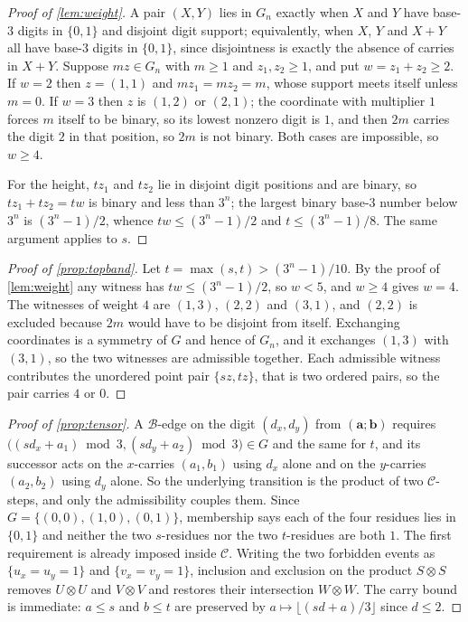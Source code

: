 \documentclass[11pt]{amsart}
\theoremstyle{definition}
\theoremstyle{remark}
\begin{document}
\begin{proof}[Proof of \cref{lem:weight}]
A pair $(X,Y)$ lies in $G_n$ exactly when $X$ and $Y$ have base-$3$ digits in $\{0,1\}$ and disjoint digit support; equivalently, when $X$, $Y$ and $X+Y$ all have base-$3$ digits in $\{0,1\}$, since disjointness is exactly the absence of carries in $X+Y$. Suppose $mz\in G_n$ with $m\ge 1$ and $z_1,z_2\ge 1$, and put $w=z_1+z_2\ge 2$. If $w=2$ then $z=(1,1)$ and $mz_1=mz_2=m$, whose support meets itself unless $m=0$. If $w=3$ then $z$ is $(1,2)$ or $(2,1)$; the coordinate with multiplier $1$ forces $m$ itself to be binary, so its lowest nonzero digit is $1$, and then $2m$ carries the digit $2$ in that position, so $2m$ is not binary. Both cases are impossible, so $w\ge 4$.

For the height, $tz_1$ and $tz_2$ lie in disjoint digit positions and are binary, so $tz_1+tz_2=tw$ is binary and less than $3^n$; the largest binary base-$3$ number below $3^n$ is $(3^n-1)/2$, whence $tw\le (3^n-1)/2$ and $t\le (3^n-1)/8$. The same argument applies to $s$.
\end{proof}

\begin{proof}[Proof of \cref{prop:topband}]
Let $t=\max(s,t)>(3^n-1)/10$. By the proof of \cref{lem:weight} any witness has $tw\le (3^n-1)/2$, so $w<5$, and $w\ge 4$ gives $w=4$. The witnesses of weight $4$ are $(1,3)$, $(2,2)$ and $(3,1)$, and $(2,2)$ is excluded because $2m$ would have to be disjoint from itself. Exchanging coordinates is a symmetry of $G$ and hence of $G_n$, and it exchanges $(1,3)$ with $(3,1)$, so the two witnesses are admissible together. Each admissible witness contributes the unordered point pair $\{sz,tz\}$, that is two ordered pairs, so the pair carries $4$ or $0$.
\end{proof}

\begin{proof}[Proof of \cref{prop:tensor}]
A $\mathcal{B}$-edge on the digit $(d_x,d_y)$ from $(\mathbf{a};\mathbf{b})$ requires $\bigl((sd_x+a_1)\bmod 3,(sd_y+a_2)\bmod 3\bigr)\in G$ and the same for $t$, and its successor acts on the $x$-carries $(a_1,b_1)$ using $d_x$ alone and on the $y$-carries $(a_2,b_2)$ using $d_y$ alone. So the underlying transition is the product of two $\mathcal{C}$-steps, and only the admissibility couples them. Since $G=\{(0,0),(1,0),(0,1)\}$, membership says each of the four residues lies in $\{0,1\}$ and neither the two $s$-residues nor the two $t$-residues are both $1$. The first requirement is already imposed inside $\mathcal{C}$. Writing the two forbidden events as $\{u_x=u_y=1\}$ and $\{v_x=v_y=1\}$, inclusion and exclusion on the product $S\otimes S$ removes $U\otimes U$ and $V\otimes V$ and restores their intersection $W\otimes W$. The carry bound is immediate: $a\le s$ and $b\le t$ are preserved by $a\mapsto\lfloor (sd+a)/3\rfloor$ since $d\le 2$.
\end{proof}
\end{document}
